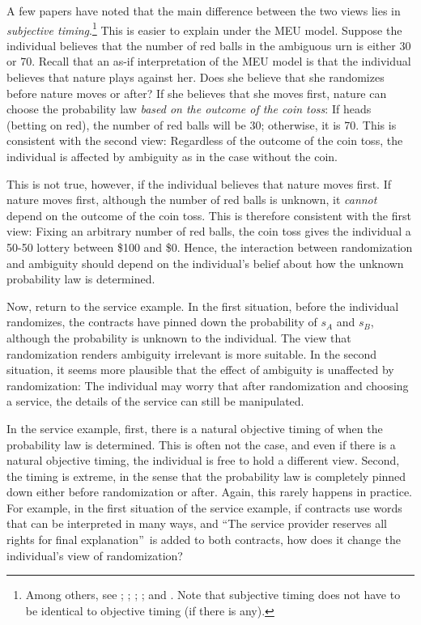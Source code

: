 \documentclass[12pt, notitlepage]{article}
\begin{document}
A few papers have noted that the main difference between the two views lies
in \textit{subjective timing}.\footnote{%
Among others, see \cite{EpsteinMarinacciSeo07}; \cite{Bade15}; \cite%
{BaillonHalevyLi15}; \cite{Saito15}; and \cite{OechsslerRauRoomets19}. Note
that subjective timing does not have to be identical to objective timing (if
there is any).} This is easier to explain under the MEU model. Suppose the
individual believes that the number of red balls in the ambiguous urn is
either 30 or 70. Recall that an as-if interpretation of the MEU model is
that the individual believes that nature plays against her. Does she believe
that she randomizes before nature moves or after? If she believes that she
moves first, nature can choose the probability law \textit{based on the
outcome of the coin toss}: If heads (betting on red), the number of red
balls will be 30; otherwise, it is 70. This is consistent with the second
view: Regardless of the outcome of the coin toss, the individual is affected
by ambiguity as in the case without the coin.

This is not true, however, if the individual believes that nature moves
first. If nature moves first, although the number of red balls is unknown,
it \textit{cannot} depend on the outcome of the coin toss. This is therefore
consistent with the first view: Fixing an arbitrary number of red balls, the
coin toss gives the individual a 50-50 lottery between \$100 and \$0. Hence,
the interaction between randomization and ambiguity should depend on the
individual's belief about how the unknown probability law is determined.

Now, return to the service example. In the first situation, before the
individual randomizes, the contracts have pinned down the probability of $%
s_{A}$ and $s_{B}$, although the probability is unknown to the individual.
The view that randomization renders ambiguity irrelevant is more suitable.
In the second situation, it seems more plausible that the effect of
ambiguity is unaffected by randomization: The individual may worry that
after randomization and choosing a service, the details of the service can
still be manipulated.

In the service example, first, there is a natural objective timing of when
the probability law is determined. This is often not the case, and even if
there is a natural objective timing, the individual is free to hold a
different view. Second, the timing is extreme, in the sense that the
probability law is completely pinned down either before randomization or
after. Again, this rarely happens in practice. For example, in the first
situation of the service example, if contracts use words that can be
interpreted in many ways, and \textquotedblleft The service provider
reserves all rights for final explanation\textquotedblright\ is added to
both contracts, how does it change the individual's view of randomization?
\end{document}
